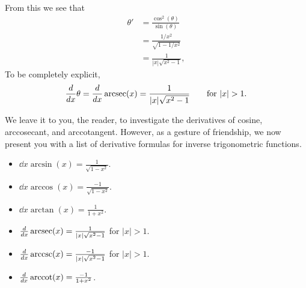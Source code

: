 \documentclass{ximera}
\begin{document}
\begin{theorem}
\begin{explanation}
\begin{image}
\end{image}
From this we see that 
\begin{align*}
  \theta' &= \frac{\cos^2(\theta)}{\sin(\theta)}\\
  &= \frac{1/x^2}{\sqrt{1-1/x^2}}\\
  &= \frac{1}{|x|\sqrt{x^2-1}},
\end{align*}
To be completely explicit, 
\[
\ddx \theta = \ddx \arcsec(x) = \frac{1}{|x|\sqrt{x^2-1}}\qquad\text{for $|x|>1$}. 
\]
\end{explanation}
\end{theorem}

We leave it to you, the reader, to investigate the derivatives of
cosine, arccosecant, and arccotangent. However, as a gesture of
friendship, we now present you with a list of derivative formulas for
inverse trigonometric functions.

\begin{theorem} \hfil
\begin{itemize}
\item $\dd{x} \arcsin(x) = \frac{1}{\sqrt{1-x^2}}$.
\item $\dd{x} \arccos(x) = \frac{-1}{\sqrt{1-x^2}}$.
\item $\dd{x} \arctan(x) = \frac{1}{1+x^2}$.
\item $\frac{d }{d x} \operatorname{arcsec}(x) = \frac{1}{|x|\sqrt{x^2-1}}$ for $|x|>1$.
\item $\frac{d }{d x} \operatorname{arccsc}(x) = \frac{-1}{|x|\sqrt{x^2-1}}$ for $|x|>1$.
\item $\frac{d }{d x} \operatorname{arccot}(x) = \frac{-1}{1+x^2}$.
\end{itemize}
\end{theorem}
\end{document}
